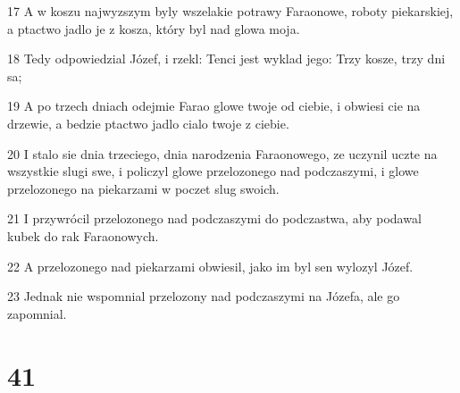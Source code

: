 \par 17 A w koszu najwyzszym byly wszelakie potrawy Faraonowe, roboty piekarskiej, a ptactwo jadlo je z kosza, który byl nad glowa moja.
\par 18 Tedy odpowiedzial Józef, i rzekl: Tenci jest wyklad jego: Trzy kosze, trzy dni sa;
\par 19 A po trzech dniach odejmie Farao glowe twoje od ciebie, i obwiesi cie na drzewie, a bedzie ptactwo jadlo cialo twoje z ciebie.
\par 20 I stalo sie dnia trzeciego, dnia narodzenia Faraonowego, ze uczynil uczte na wszystkie slugi swe, i policzyl glowe przelozonego nad podczaszymi, i glowe przelozonego na piekarzami w poczet slug swoich.
\par 21 I przywrócil przelozonego nad podczaszymi do podczastwa, aby podawal kubek do rak Faraonowych.
\par 22 A przelozonego nad piekarzami obwiesil, jako im byl sen wylozyl Józef.
\par 23 Jednak nie wspomnial przelozony nad podczaszymi na Józefa, ale go zapomnial.

\chapter{41}

